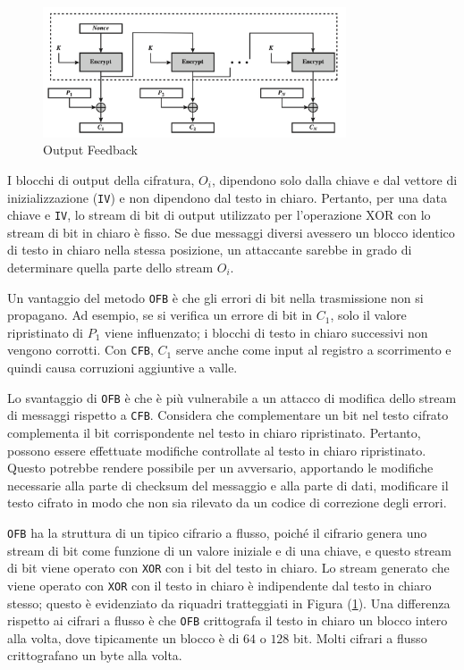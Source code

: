 \begin{figure}[H]
    \centering
    \includegraphics[width=0.8\textwidth]{img/outputFeedback.png}
    \caption{Output Feedback}
    \label{fig:outputFeedback}
\end{figure}
I blocchi di output della cifratura, \(O_i\), dipendono solo dalla chiave
e dal vettore di inizializzazione (\verb|IV|) e non dipendono dal testo
in chiaro. Pertanto, per una data chiave e \verb|IV|, lo stream di bit di
output utilizzato per l'operazione XOR con lo stream di bit in chiaro è fisso.
Se due messaggi diversi avessero un blocco identico di testo in chiaro
nella stessa posizione, un attaccante sarebbe in grado di determinare
quella parte dello stream \(O_i\).

Un vantaggio del metodo \verb|OFB| è che gli errori di bit nella trasmissione non
si propagano. Ad esempio, se si verifica un errore di bit in \(C_1\), solo
il valore ripristinato di \(P_1\) viene influenzato; i blocchi di testo in
chiaro successivi non vengono corrotti. Con \verb|CFB|, \(C_1\) serve anche come
input al registro a scorrimento e quindi causa corruzioni aggiuntive a valle.

Lo svantaggio di \verb|OFB| è che è più vulnerabile a un attacco di modifica dello
stream di messaggi rispetto a \verb|CFB|. Considera che complementare un bit nel
testo cifrato complementa il bit corrispondente nel testo in chiaro
ripristinato. Pertanto, possono essere effettuate modifiche controllate
al testo in chiaro ripristinato. Questo potrebbe rendere possibile per un
avversario, apportando le modifiche necessarie alla parte di checksum del
messaggio e alla parte di dati, modificare il testo cifrato in modo che non
sia rilevato da un codice di correzione degli errori.

\verb|OFB| ha la struttura di un tipico cifrario a flusso, poiché il cifrario
genera uno stream di bit come funzione di un valore iniziale e di una chiave,
e questo stream di bit viene operato con \verb|XOR| con i bit del testo in chiaro.
Lo stream generato che viene operato con \verb|XOR| con il testo in chiaro è
indipendente dal testo in chiaro stesso; questo è evidenziato da riquadri
tratteggiati in Figura (\ref{fig:outputFeedback}). Una differenza rispetto
ai cifrari a flusso è che \verb|OFB| crittografa il testo in chiaro un blocco
intero alla volta, dove tipicamente un blocco è di $64$ o $128$ bit. Molti
cifrari a flusso crittografano un byte alla volta.

